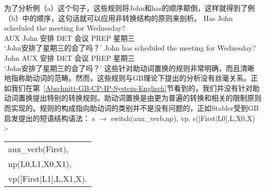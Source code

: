 为了分析例（a）这个句子，这些规则将John和has的顺序颠倒，这样就得到了例（b）中的顺序，这句话就可以应用非转换结构的原则来剖析。
\eal
\ex 
\gll Has John scheduled the meeting for Wednesday?\\
AUX John 安排 DET 会议 PREP 星期三\\
\glt`John安排了星期三的会了吗？'
\ex 
\gll John has scheduled the meeting for Wednesday?\\
John AUX 安排 DET 会议 PREP 星期三\\
\glt `John安排了星期三的会了吗？'
\zl
这些针对助动词置换的规则非常明确，而且清晰地指称助动词的范畴。然而，这些规则与GB理论下提出的分析没有丝毫关系。正如我们在第~\ref{Abschnitt-GB-CP-IP-System-Englisch}节看到的，我们并没有针对助动词置换提出特别的转换规则。助动词置换是由更为普遍的转换\movealpha 和相关的限制原则而实现的。规则的构成指向助动词的类别并不是没有问题的，正如Stabler受到GB启发提出的短语结构语法：
\eal
\ex\label{Regel-Aux-inv-Stabler} s $\to$ switch(aux\_verb,np), vp.
\ex s([First$|$L0],L,X0,X) :- \begin{tabular}[t]{@{}l@{}}
                              aux\_verb(First),\\
                              np(L0,L1,X0,X1),\\
                              vp([First$|$L1],L,X1,X).\\
                              \end{tabular}
